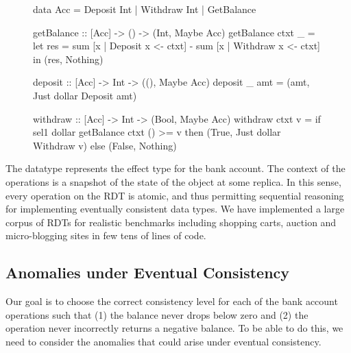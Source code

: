 \begin{figure}
\begin{codehaskell}
data Acc = Deposit Int | Withdraw Int
				 | GetBalance

getBalance :: [Acc] -> () -> (Int, Maybe Acc)
getBalance ctxt _ =
  let res = sum [x | Deposit x <- ctxt]
						- sum [x | Withdraw x <- ctxt]
	in (res, Nothing)

deposit :: [Acc] -> Int -> ((), Maybe Acc)
deposit _ amt = (amt, Just dollar Deposit amt)

withdraw :: [Acc] -> Int -> (Bool, Maybe Acc)
withdraw ctxt v =
	if sel1 dollar getBalance ctxt () >= v
  then (True, Just dollar Withdraw v)
	else (False, Nothing)
\end{codehaskell}
\label{Definition of a bank account expressed in Quelea.}
\label{fig:ex}
\end{figure}

The datatype  represents the effect type for the bank account. The
context of the operations is a snapshot of the state of the object at some
replica. In this sense, every operation on the RDT is atomic, and thus
permitting sequential reasoning for implementing eventually consistent data
types. We have implemented a large corpus of RDTs for realistic benchmarks
including shopping carts, auction and micro-blogging sites in few tens of lines
of code.

\subsection{Anomalies under Eventual Consistency}

Our goal is to choose the correct consistency level for each of the bank
account operations such that (1) the balance never drops below zero and (2) the
 operation never incorrectly returns a negative balance. To be
able to do this, we need to consider the anomalies that could arise under
eventual consistency.

